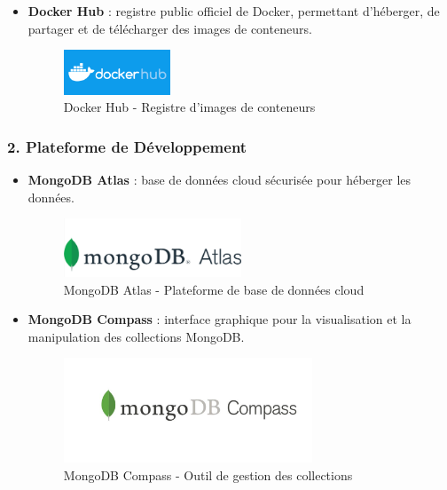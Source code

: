 \begin{itemize}
    \item \textbf{Docker Hub} : registre public officiel de Docker, permettant d’héberger, de partager et de télécharger des images de conteneurs.
    \begin{figure}[H]
        \centering
        \includegraphics[width=0.3\textwidth]{logos/dockerhub.png}
        \caption{Docker Hub - Registre d’images de conteneurs}
    \end{figure}
\end{itemize}

\subsubsection{2. Plateforme de Développement}

\begin{itemize}
    \item \textbf{MongoDB Atlas} : base de données cloud sécurisée pour héberger les données.
    \begin{figure}[H]
        \centering
        \includegraphics[width=0.5\textwidth]{logos/mongodb-atlas.png}
        \caption{MongoDB Atlas - Plateforme de base de données cloud}
    \end{figure}

    \item \textbf{MongoDB Compass} : interface graphique pour la visualisation et la manipulation des collections MongoDB.
    \begin{figure}[H]
        \centering
        \includegraphics[width=0.7\textwidth]{logos/mongodb-compass.png}
        \caption{MongoDB Compass - Outil de gestion des collections}
    \end{figure}
\end{itemize}

